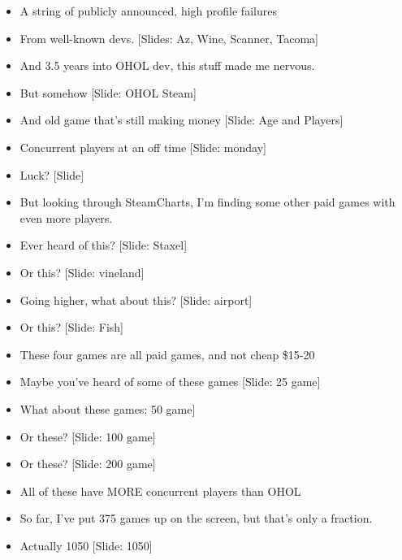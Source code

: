 \documentclass[12pt]{article}
\begin{document}
{\begin{itemize}
\item A string of publicly announced, high profile failures

\item From well-known devs.  [Slides:  Az, Wine, Scanner, Tacoma]

\item And 3.5 years into OHOL dev, this stuff made me nervous.

\item But somehow [Slide:  OHOL Steam]

\item And old game that's still making money [Slide:  Age and Players]

\item Concurrent players at an off time [Slide: monday]

\item Luck?  [Slide]

\item But looking through SteamCharts, I'm finding some other paid games with even more players.

\item Ever heard of this?  [Slide:  Staxel]

\item Or this?  [Slide: vineland]

\item Going higher, what about this? [Slide: airport]

\item Or this? [Slide: Fish]

\item These four games are all paid games, and not cheap \$15-20

\item Maybe you've heard of some of these games [Slide: 25 game]

\item What about these games: 50 game]

\item Or these? [Slide: 100 game]

\item Or these? [Slide: 200 game]

\item All of these have MORE concurrent players than OHOL

\item So far, I've put 375 games up on the screen, but that's only a fraction.

\item Actually 1050 [Slide:  1050]


\end{itemize}}
\end{document}
